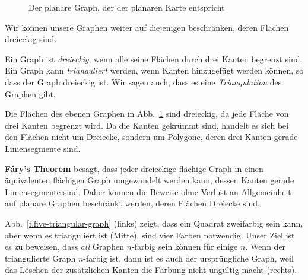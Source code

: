 \begin{figure}[t]
\begin{minipage}{.45\textwidth}
\caption{Der planare Graph, der der planaren Karte entspricht}\label{f.five-planar-graph-graph}
\end{minipage}
\end{figure}

Wir können unsere Graphen weiter auf diejenigen beschränken, deren Flächen dreieckig sind.

\begin{definition}
Ein Graph ist \emph{dreieckig}, wenn alle seine Flächen durch drei Kanten begrenzt sind. Ein Graph kann \emph{trianguliert} werden, wenn Kanten hinzugefügt werden können, so dass der Graph dreieckig ist. Wir sagen auch, dass es eine \emph{Triangulation} des Graphen gibt.
\end{definition}

\begin{example}
Die Flächen des ebenen Graphen in Abb.~\ref{f.five-planar-graph-graph} sind dreieckig, da jede Fläche von drei Kanten begrenzt wird. Da die Kanten gekrümmt sind, handelt es sich bei den Flächen nicht um Dreiecke, sondern um Polygone, deren drei Kanten gerade Liniensegmente sind.
\end{example}

\begin{advanced}
\textbf{F\'{a}ry's Theorem} besagt, dass jeder dreieckige flächige Graph in einen äquivalenten flächigen Graph umgewandelt werden kann, dessen Kanten gerade Liniensegmente sind. Daher können die Beweise ohne Verlust an Allgemeinheit auf planare Graphen beschränkt werden, deren Flächen Dreiecke sind.
\end{advanced}

\begin{example}
Abb.~\ref{f.five-triangular-graph} (links) zeigt, dass ein Quadrat zweifarbig sein kann, aber wenn es trianguliert ist (Mitte), sind vier Farben notwendig. Unser Ziel ist es zu beweisen, dass \emph{all} Graphen $n$-farbig sein können für einige $n$. Wenn der triangulierte Graph $n$-farbig ist, dann ist es auch der ursprüngliche Graph, weil das Löschen der zusätzlichen Kanten die Färbung nicht ungültig macht (rechts).
\end{example}

